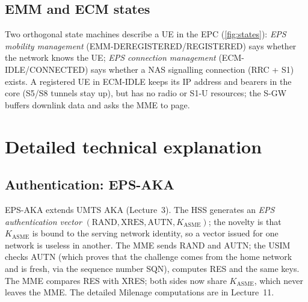 \documentclass[11pt,a4paper]{article}
\begin{document}
\subsection{EMM and ECM states}
Two orthogonal state machines describe a UE in the EPC (\cref{fig:states}): \emph{EPS mobility
management} (EMM-DEREGISTERED/REGISTERED) says whether the network knows the UE; \emph{EPS
connection management} (ECM-IDLE/CONNECTED) says whether a NAS signalling connection (RRC + S1)
exists. A registered UE in ECM-IDLE keeps its IP address and bearers in the core (S5/S8 tunnels stay
up), but has no radio or S1-U resources; the S-GW buffers downlink data and asks the MME to page.

\begin{acnfigure}
  \caption{EMM (registration) and ECM (signalling connection) states of a UE in the EPC.}
  \label{fig:states}
\end{acnfigure}

\section{Detailed technical explanation}

\subsection{Authentication: EPS-AKA}
EPS-AKA \cite{ts33401} extends UMTS AKA (Lecture~3). The HSS generates an \emph{EPS authentication
vector} $(\text{RAND}, \text{XRES}, \text{AUTN}, K_{\mathrm{ASME}})$; the novelty is that
$K_{\mathrm{ASME}}$ is bound to the serving network identity, so a vector issued for one network is
useless in another. The MME sends RAND and AUTN; the USIM checks AUTN (which proves that the
challenge comes from the home network and is fresh, via the sequence number SQN), computes RES and
the same keys. The MME compares RES with XRES; both sides now share $K_{\mathrm{ASME}}$, which never
leaves the MME. The detailed Milenage computations are in Lecture~11.
\end{document}
